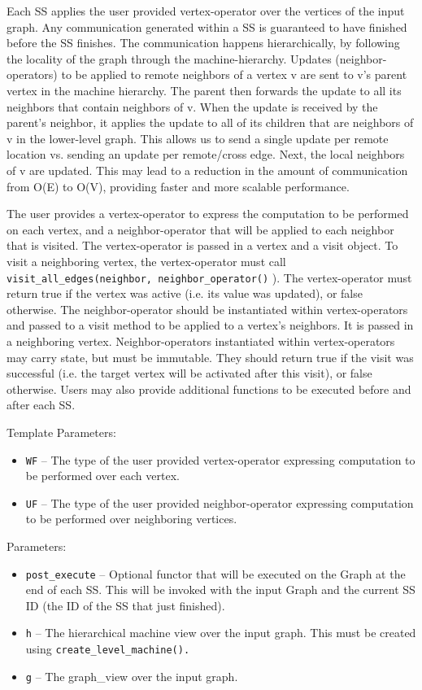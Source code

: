 Each SS applies the user provided vertex-operator over the vertices of the input graph. Any communication generated within a SS is guaranteed to have finished before the SS finishes. The communication happens hierarchically, by following the locality of the graph through the machine-hierarchy. Updates (neighbor-operators) to be applied to remote neighbors of a vertex v are sent to v's parent vertex in the machine hierarchy. The parent then forwards the update to all its neighbors that contain neighbors of v. When the update is received by the parent's neighbor, it applies the update to all of its children that are neighbors of v in the lower-level graph. This allows us to send a single update per remote location vs. sending an update per remote/cross edge. Next, the local neighbors of v are updated. This may lead to a reduction in the amount of communication from O(E) to O(V), providing faster and more scalable performance.

The user provides a vertex-operator to express the computation to be performed on each vertex, and a neighbor-operator that will be applied to each neighbor that is visited. The vertex-operator is passed in a vertex and a visit object. To visit a neighboring vertex, the vertex-operator must call 
\texttt{visit\_all\_edges(neighbor, neighbor\_operator()}
). The vertex-operator must return true if the vertex was active (i.e. its value was updated), or false otherwise. The neighbor-operator should be instantiated within vertex-operators and passed to a visit method to be applied to a vertex's neighbors. It is passed in a neighboring vertex. Neighbor-operators instantiated within vertex-operators may carry state, but must be immutable. They should return true if the visit was successful (i.e. the target vertex will be activated after this visit), or false otherwise. Users may also provide additional functions to be executed before and after each SS.

Template Parameters:
\begin{itemize}
\item
\texttt{WF} --
The type of the user provided vertex-operator expressing computation to be performed over each vertex.
\item
\texttt{UF} --
The type of the user provided neighbor-operator expressing computation to be performed over neighboring vertices.
\end{itemize}

Parameters:
\begin{itemize}
\item
\texttt{post\_execute} --
Optional functor that will be executed on the Graph at the end of each SS. This will be invoked with the input Graph and the current SS ID (the ID of the SS that just finished).
\item
\texttt{h} --
The hierarchical machine view over the input graph. This must be created using 
\texttt{create\_level\_machine().}
\item
\texttt{g} --
The graph\_view over the input graph.
\end{itemize}

